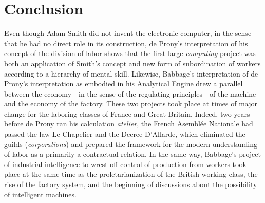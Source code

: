 \documentclass[version=last,draft=false,paper=A4,portrait,twoside=true,twocolumn=false,headinclude=false,footinclude=false,fontsize=12,BCOR=20mm,DIV=calc,pagesize=auto,titlepage=firstiscover,mpinclude=false,open=right,chapterprefix=true,numbers=autoendperiod,headsepline=false,headings=twolinechapter,parskip=false]{scrbook}
\begin{document}
\backmatter
\chapter{Conclusion} 

Even though Adam Smith did not invent the electronic computer, in the sense
that he had no direct role in its construction, de Prony's interpretation
of his concept of the division of labor shows that the first large
\emph{computing} project was both an application of Smith's concept and new form
of subordination of workers according to a hierarchy of mental skill.
Likewise, Babbage's interpretation of de Prony's interpretation as embodied
in his Analytical Engine drew a parallel between the economy---in the sense
of the regulating principles---of the machine and the economy of the
factory. These two projects took place at times of major change for the
laboring classes of France and Great Britain. Indeed, two years before de
Prony ran his calculation \emph{atelier}, the French Asemblée Nationale had passed
the law Le Chapelier and the Decree D'Allarde, which eliminated the guilds
(\emph{corporations}) and prepared the framework for the modern understanding of
labor as a primarily a contractual relation. In the same way, Babbage's
project of industrial intelligence to wrest off control of production from
workers took place at the same time as the proletarianization of the
British working class, the rise of the factory system, and the beginning of
discussions about the possibility of intelligent machines. 
\end{document}
